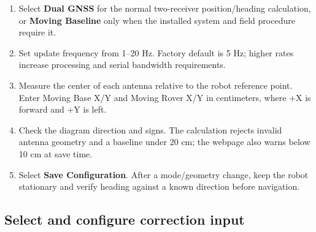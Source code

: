\documentclass[
  10pt,
  letterpaper,
  openany]{report}
\providecommand{\tightlist}{%
  \setlength{\itemsep}{0pt}\setlength{\parskip}{0pt}}
\begin{document}
\begin{enumerate}
\tightlist
\item
  Select \textbf{Dual GNSS} for the normal two-receiver position/heading
  calculation, or \textbf{Moving Baseline} only when the installed
  system and field procedure require it.
\item
  Set update frequency from 1--20 Hz. Factory default is 5 Hz; higher
  rates increase processing and serial bandwidth requirements.
\item
  Measure the center of each antenna relative to the robot reference
  point. Enter Moving Base X/Y and Moving Rover X/Y in centimeters,
  where +X is forward and +Y is left.
\item
  Check the diagram direction and signs. The calculation rejects invalid
  antenna geometry and a baseline under 20 cm; the webpage also warns
  below 10 cm at save time.
\item
  Select \textbf{Save Configuration}. After a mode/geometry change, keep
  the robot stationary and verify heading against a known direction
  before navigation.
\end{enumerate}

\subsection{Select and configure correction
input}\label{select-and-configure-correction-input}
\end{document}
